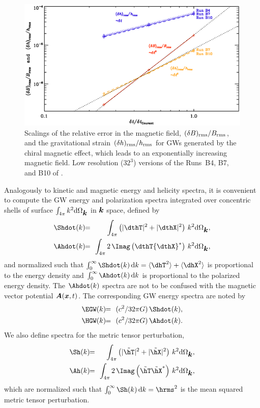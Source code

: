 \documentclass[\mydriver,12pt,twoside,notitlepage,a4paper]{article}
\renewcommand{\vec}[1]{\mbox{\boldmath{$#1$}}}
\newcommand{\Av}            {\vec{A}}
\newcommand{\kv}            {\vec{k}}
\newcommand{\xv}            {\vec{x}}
\newcommand{\bra}[1]{\langle #1\rangle}
\newcommand{\dd}{{\rm d} {}}
\begin{document}
\begin{figure}[h!]\begin{center}
\includegraphics[width=\columnwidth]{pdel}
\end{center}\caption[]{
  Scalings of the relative error in the magnetic field,
  $(\delta B)_{\rm rms}/B_{\rm rms}$, and the gravitational
  strain $(\delta h)_{\rm rms}/h_{\rm rms}$ for GWs generated
  by the chiral magnetic effect, which leads to an exponentially
  increasing magnetic field.
  Low resolution ($32^3$) versions of the Runs~B4, B7, and B10
  of \cite{BHKRS21}.
}\label{pdel}\end{figure}

Analogously to kinetic and magnetic energy and helicity spectra, it is
convenient to compute the GW energy and polarization spectra integrated
over concentric shells of surface $\int_{4\pi}k^2\dd\Omega_{\kv}$ in $\kv$
space, defined by
\begin{eqnarray}
\Shdot(k)\!\!&=&\!\!\int_{4\pi}\left(|\dthT|^2+|\dthX|^2\right)\,k^2\dd\Omega_{\kv},\\
\Ahdot(k)\!\!&=&\!\!\int_{4\pi}2\,\Imag\left(\dthT{{\dthX}}^\ast\right)\,k^2\dd\Omega_{\kv},
\end{eqnarray}
and normalized such that $\int_0^\infty\Shdot(k)\,\dd k=\bra{\dhT^2}+\bra{\dhX^2}$
is proportional to the energy density and $\int_0^\infty \Ahdot(k)\,\dd k$
is proportional to the polarized energy density.
The $\Ahdot(k)$ spectra are not to be confused with the magnetic vector
potential $\Av(\xv,t)$.
The corresponding GW energy spectra are noted by
\begin{eqnarray}
\EGW(k)\!\!&=&\!\!(c^2/32\pi G)\,\Shdot(k),\\
\HGW(k)\!\!&=&\!\!(c^2/32\pi G)\,\Ahdot(k).
\end{eqnarray}
We also define spectra for the metric tensor perturbation,
\begin{eqnarray}
\Sh(k)\!\!&=&\!\!\int_{4\pi}\left(|\tilde\hT|^2+|\tilde\hX|^2\right)\,k^2\dd\Omega_{\kv},\\
\Ah(k)\!\!&=&\!\!\int_{4\pi}2\,\Imag\left(\tilde\hT\tilde\hX^\ast\right)\,k^2\dd\Omega_{\kv},
\end{eqnarray}
which are normalized such that $\int_0^\infty\Sh(k)\,\dd k=\hrms^2$ is the
mean squared metric tensor perturbation.
\end{document}
